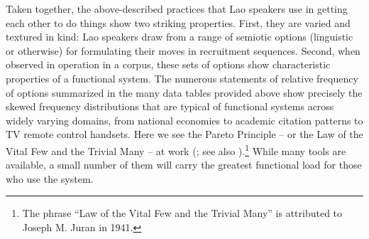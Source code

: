 \documentclass[output=paper]{langsci/langscibook}
\begin{document}
Taken together, the above-described practices that Lao speakers use in getting each other to do things show two striking properties. First, they are varied and textured in kind: Lao speakers draw from a range of semiotic options (linguistic or otherwise) for formulating their moves in recruitment sequences. Second, when observed in operation in a corpus, these sets of options show characteristic properties of a functional system. The numerous statements of relative frequency of options summarized in the many data tables provided above show precisely the skewed frequency distributions that are typical of functional systems across widely varying domains, from national economies to academic citation patterns to TV remote control handsets. Here we see the Pareto Principle -- or the Law of the Vital Few and the Trivial Many -- at work (\citealt{Pareto1971}; see also \citealt{Zipf1949}).\footnote{The phrase “Law of the Vital Few and the Trivial Many” is attributed to Joseph M. Juran in 1941.} While many tools are available, a small number of them will carry the greatest functional load for those who use the system.
\end{document}

